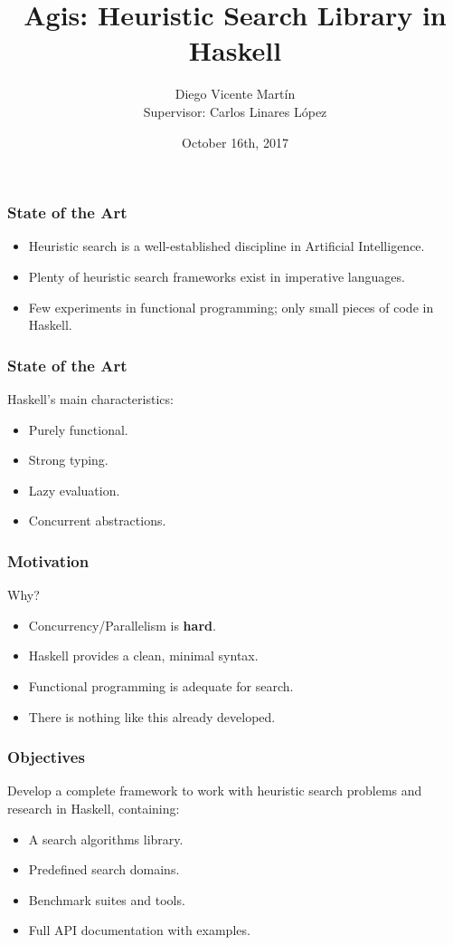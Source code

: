 \documentclass{beamer}
\title[Agis: Search in Haskell]{Agis: Heuristic Search Library in Haskell}
\author[Diego Vicente]{Diego Vicente Martín \\
  {\small Supervisor: Carlos Linares López}}
\institute{Universidad Carlos III de Madrid}
\date{October 16th, 2017}
\begin{document}
\frame{\titlepage}

\begin{frame}
  \frametitle{State of the Art}
  \begin{itemize}
  \item Heuristic search is a well-established discipline in Artificial
    Intelligence.
  \item Plenty of heuristic search frameworks exist in imperative languages.
  \item Few experiments in functional programming; only small pieces of code in
    Haskell.
  \end{itemize}
\end{frame}

\begin{frame}
  \frametitle{State of the Art}
  Haskell's main characteristics:
  \begin{itemize}
  \item Purely functional.
  \item Strong typing.
  \item Lazy evaluation.
  \item Concurrent abstractions.
  \end{itemize}
\end{frame}

\begin{frame}
  \frametitle{Motivation}
  Why?
  \begin{itemize}
  \item Concurrency/Parallelism is \textbf{hard}.
  \item Haskell provides a clean, minimal syntax.
  \item Functional programming is adequate for search.
  \item There is nothing like this already developed.
  \end{itemize}
\end{frame}

\begin{frame}
  \frametitle{Objectives}
  Develop a complete framework to work with heuristic search problems and
  research in Haskell, containing:
  \begin{itemize}
  \item A search algorithms library.
  \item Predefined search domains.
  \item Benchmark suites and tools.
  \item Full API documentation with examples.
  \end{itemize}
\end{frame}
\end{document}

